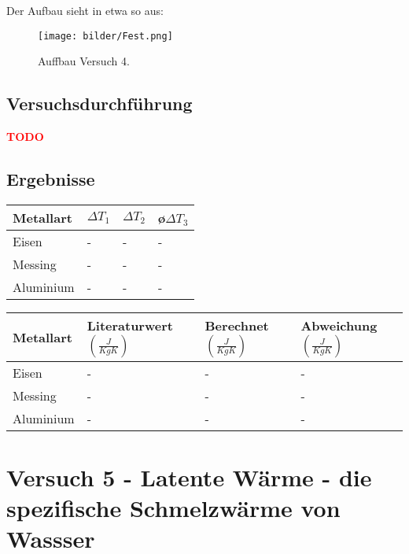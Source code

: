 	Der Aufbau sieht in etwa so aus:
	       	\begin{figure}[ht]
		\label{fig:abb4}
		\begin{center}
			\texttt{[image: bilder/Fest.png]}
			\caption{Auffbau Versuch 4.}
		\end{center}
	\end{figure}
    \subsection{Versuchsdurchführung}


    		\textbf{\textcolor{red}{TODO}}
    \subsection{Ergebnisse}



        \begin{table}[H]
            \centering
            \begin{tabular}{|l|l|l|l|}
                \hline
                Metallart & $\Delta T_{1}$ & $\Delta T_{2}$ & \o $ \Delta T_{3}$\\
                \hline
                Eisen& - & - & - \\
                \hline
                Messing & - & - & - \\
                \hline
                Aluminium& - & - & - \\
                \hline
            \end{tabular}
        \end{table}
        
        \begin{table}[H]
        	\centering
        	\begin{tabular}{|l|l|l|l|}
        		\hline
        		Metallart & Literaturwert $(\frac{J}{KgK})$ & Berechnet $(\frac{J}{KgK})$ & Abweichung $(\frac{J}{KgK})$ \\
        		\hline
        		Eisen& - & - & - \\
        		\hline
        		Messing & - & - & - \\
        		\hline
        		Aluminium& - & - & - \\
        		\hline
        	\end{tabular}
        \end{table}



\section{Versuch 5 - Latente Wärme - die spezifische Schmelzwärme von Wassser}
